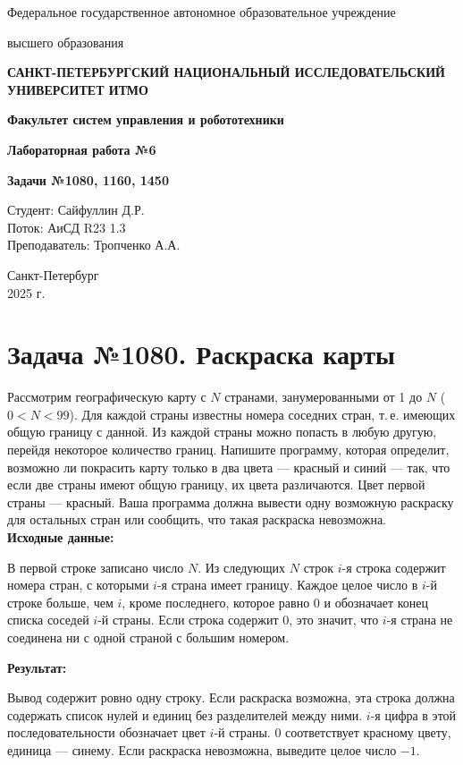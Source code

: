 \documentclass[a4paper,12pt]{article}
\begin{document}
\begin{titlepage}
    \centering
    {\large Федеральное государственное автономное образовательное учреждение\par}
    {\large высшего образования\par}
    {\bfseries САНКТ-ПЕТЕРБУРГСКИЙ НАЦИОНАЛЬНЫЙ ИССЛЕДОВАТЕЛЬСКИЙ УНИВЕРСИТЕТ ИТМО\par}
    {\bfseries Факультет систем управления и робототехники\par}
    \vfill
    {\Large \bfseries Лабораторная работа №6\par}
    {\Large \bfseries Задачи №1080, 1160, 1450\par}
    \vfill
    
    \begin{flushright}
        Студент: Сайфуллин Д.Р. \\
        Поток: АиСД R23 1.3 \\
        Преподаватель: Тропченко А.А.
    \end{flushright}
    \vfill
    Санкт-Петербург \\
    2025 г.
\end{titlepage}

\section*{Задача №1080. Раскраска карты}
Рассмотрим географическую карту с $N$ странами, занумерованными от 1 до $N$ ($0 < N < 99$). Для каждой страны известны номера соседних стран, т.\,е. имеющих общую границу с данной. Из каждой страны можно попасть в любую другую, перейдя некоторое количество границ. Напишите программу, которая определит, возможно ли покрасить карту только в два цвета — красный и синий — так, что если две страны имеют общую границу, их цвета различаются. Цвет первой страны — красный. Ваша программа должна вывести одну возможную раскраску для остальных стран или сообщить, что такая раскраска невозможна.\\[1em]
\textbf{Исходные данные:}
\begin{quotebox}
    В первой строке записано число $N$. Из следующих $N$ строк $i$-я строка содержит номера стран, с которыми $i$-я страна имеет границу. Каждое целое число в $i$-й строке больше, чем $i$, кроме последнего, которое равно 0 и обозначает конец списка соседей $i$-й страны. Если строка содержит 0, это значит, что $i$-я страна не соединена ни с одной страной с большим номером.
\end{quotebox}
\textbf{Результат:}
\begin{quotebox}
    Вывод содержит ровно одну строку. Если раскраска возможна, эта строка должна содержать список нулей и единиц без разделителей между ними. $i$-я цифра в этой последовательности обозначает цвет $i$-й страны. 0 соответствует красному цвету, единица — синему. Если раскраска невозможна, выведите целое число $-1$.
\end{quotebox}
\end{document}
